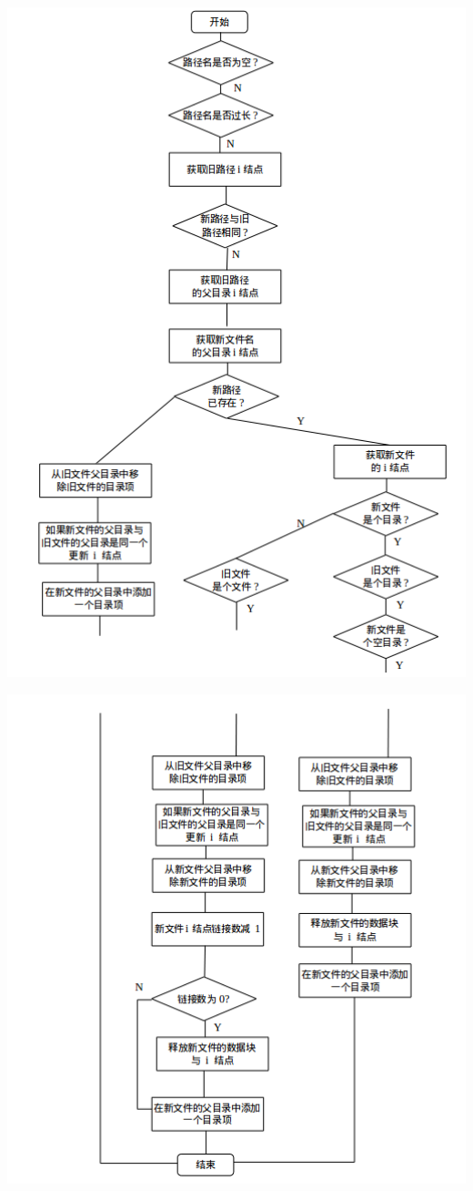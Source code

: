 \documentclass[nofonts]{ctexart}
\begin{document}
\begin{itemize}
  \includegraphics[width=15cm]{./images/./rename_1.png}

  \includegraphics[width=15cm]{./images/./rename_2.png}
  \end{itemize}
\end{document}
